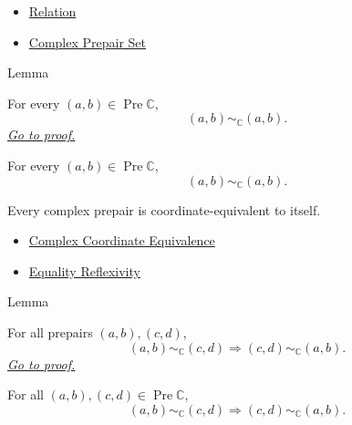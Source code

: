 \begin{dependencies}
\begin{itemize}
  \item \hyperref[def:relation]{Relation}
  \item \hyperref[def:complex-prepair-set]{Complex Prepair Set}
\end{itemize}
\end{dependencies}

\begin{lemmabox}{Lemma}
\begin{lemma}
\label{lem:complex-coordinate-equivalence-reflexive}
For every $(a,b)\in\operatorname{Pre}\mathbb{C}$,
\[
(a,b)\sim_{\mathbb{C}}(a,b).
\]
\hyperref[prf:complex-coordinate-equivalence-reflexive]{\textit{Go to proof.}}
\end{lemma}
\end{lemmabox}

\begin{remark*}
For every $(a,b)\in\operatorname{Pre}\mathbb{C}$,
\[
(a,b)\sim_{\mathbb{C}}(a,b).
\]
\end{remark*}

\begin{remark*}[Interpretation]
Every complex prepair is coordinate-equivalent to itself.
\end{remark*}

\begin{dependencies}
\begin{itemize}
  \item \hyperref[def:complex-coordinate-equivalence]{Complex Coordinate Equivalence}
  \item \hyperref[ax:equality-reflexivity]{Equality Reflexivity}
\end{itemize}
\end{dependencies}

\begin{lemmabox}{Lemma}
\begin{lemma}
\label{lem:complex-coordinate-equivalence-symmetric}
For all prepairs $(a,b),(c,d)$,
\[
(a,b)\sim_{\mathbb{C}}(c,d)
\Longrightarrow
(c,d)\sim_{\mathbb{C}}(a,b).
\]
\hyperref[prf:complex-coordinate-equivalence-symmetric]{\textit{Go to proof.}}
\end{lemma}
\end{lemmabox}

\begin{remark*}
For all $(a,b),(c,d)\in\operatorname{Pre}\mathbb{C}$,
\[
(a,b)\sim_{\mathbb{C}}(c,d)
\Longrightarrow
(c,d)\sim_{\mathbb{C}}(a,b).
\]
\end{remark*}

